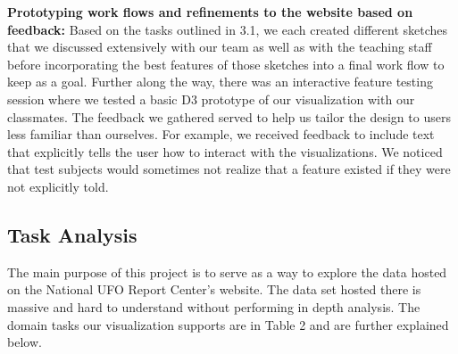 \documentclass[journal]{vgtc}                %
\begin{document}
\textbf{Prototyping work flows and refinements to the website based on feedback:} Based on the tasks outlined in 3.1, we each created different sketches that we discussed extensively with our team as well as with the teaching staff before incorporating the best features of those sketches into a final work flow to keep as a goal.  Further along the way, there was an interactive feature testing session where we tested a basic D3 prototype of our visualization with our classmates. The feedback we gathered served to help us tailor the design to users less familiar than ourselves. For example, we received feedback to include text that explicitly tells the user how to interact with the visualizations. We noticed that test subjects would sometimes not realize that a feature existed if they were not explicitly told. 


\subsection{Task Analysis}
The main purpose of this project is to serve as a way to explore the data hosted on the National UFO Report Center's website. The data set hosted there is massive and hard to understand without performing in depth analysis. The domain tasks our visualization supports are in Table 2 and are further explained below.
\end{document}
